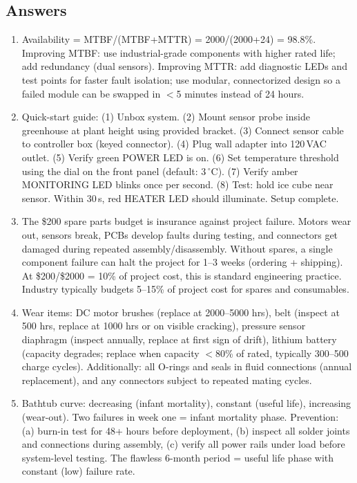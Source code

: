 \documentclass[11pt,letterpaper,twoside,openany]{book}
\newcommand{\degC}{\ensuremath{{}^{\circ}\text{C}}}
\begin{document}
\subsection{Answers}
\begin{enumerate}[leftmargin=1.5em]
\item Availability = MTBF/(MTBF+MTTR) = 2000/(2000+24) = 98.8\%. Improving MTBF: use industrial-grade components with higher rated life; add redundancy (dual sensors). Improving MTTR: add diagnostic LEDs and test points for faster fault isolation; use modular, connectorized design so a failed module can be swapped in $<$5 minutes instead of 24 hours.
\item Quick-start guide: (1) Unbox system. (2) Mount sensor probe inside greenhouse at plant height using provided bracket. (3) Connect sensor cable to controller box (keyed connector). (4) Plug wall adapter into 120\,VAC outlet. (5) Verify green POWER LED is on. (6) Set temperature threshold using the dial on the front panel (default: 3\,\degC{}). (7) Verify amber MONITORING LED blinks once per second. (8) Test: hold ice cube near sensor. Within 30\,s, red HEATER LED should illuminate. Setup complete.
\item The \$200 spare parts budget is insurance against project failure. Motors wear out, sensors break, PCBs develop faults during testing, and connectors get damaged during repeated assembly/disassembly. Without spares, a single component failure can halt the project for 1--3 weeks (ordering + shipping). At \$200/\$2000 = 10\% of project cost, this is standard engineering practice. Industry typically budgets 5--15\% of project cost for spares and consumables.
\item Wear items: DC motor brushes (replace at 2000--5000 hrs), belt (inspect at 500 hrs, replace at 1000 hrs or on visible cracking), pressure sensor diaphragm (inspect annually, replace at first sign of drift), lithium battery (capacity degrades; replace when capacity $<$80\% of rated, typically 300--500 charge cycles). Additionally: all O-rings and seals in fluid connections (annual replacement), and any connectors subject to repeated mating cycles.
\item Bathtub curve: decreasing (infant mortality), constant (useful life), increasing (wear-out). Two failures in week one = infant mortality phase. Prevention: (a) burn-in test for 48+ hours before deployment, (b) inspect all solder joints and connections during assembly, (c) verify all power rails under load before system-level testing. The flawless 6-month period = useful life phase with constant (low) failure rate.

\end{enumerate}
\end{document}
